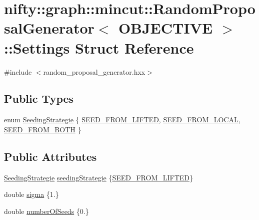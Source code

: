 \hypertarget{structnifty_1_1graph_1_1mincut_1_1RandomProposalGenerator_1_1Settings}{}\section{nifty\+:\+:graph\+:\+:mincut\+:\+:Random\+Proposal\+Generator$<$ O\+B\+J\+E\+C\+T\+I\+V\+E $>$\+:\+:Settings Struct Reference}
\label{structnifty_1_1graph_1_1mincut_1_1RandomProposalGenerator_1_1Settings}


{\ttfamily \#include $<$random\+\_\+proposal\+\_\+generator.\+hxx$>$}

\subsection*{Public Types}
\begin{DoxyCompactItemize}
\item 
enum \hyperlink{structnifty_1_1graph_1_1mincut_1_1RandomProposalGenerator_1_1Settings_a1037544cf92e5f126732c989c24e9dd1}{Seeding\+Strategie} \{ \hyperlink{structnifty_1_1graph_1_1mincut_1_1RandomProposalGenerator_1_1Settings_a1037544cf92e5f126732c989c24e9dd1a81b487c174807fb2dcb74976950dd0e6}{S\+E\+E\+D\+\_\+\+F\+R\+O\+M\+\_\+\+L\+I\+F\+T\+E\+D}, 
\hyperlink{structnifty_1_1graph_1_1mincut_1_1RandomProposalGenerator_1_1Settings_a1037544cf92e5f126732c989c24e9dd1a72e79898a1b8fc3fcfa97f6b76fa126f}{S\+E\+E\+D\+\_\+\+F\+R\+O\+M\+\_\+\+L\+O\+C\+A\+L}, 
\hyperlink{structnifty_1_1graph_1_1mincut_1_1RandomProposalGenerator_1_1Settings_a1037544cf92e5f126732c989c24e9dd1abe97589774d6da542ee8512d3ad73000}{S\+E\+E\+D\+\_\+\+F\+R\+O\+M\+\_\+\+B\+O\+T\+H}
 \}
\end{DoxyCompactItemize}
\subsection*{Public Attributes}
\begin{DoxyCompactItemize}
\item 
\hyperlink{structnifty_1_1graph_1_1mincut_1_1RandomProposalGenerator_1_1Settings_a1037544cf92e5f126732c989c24e9dd1}{Seeding\+Strategie} \hyperlink{structnifty_1_1graph_1_1mincut_1_1RandomProposalGenerator_1_1Settings_a1faf765d85ccfa38cd6d13cfa9072163}{seeding\+Strategie} \{\hyperlink{structnifty_1_1graph_1_1mincut_1_1RandomProposalGenerator_1_1Settings_a1037544cf92e5f126732c989c24e9dd1a81b487c174807fb2dcb74976950dd0e6}{S\+E\+E\+D\+\_\+\+F\+R\+O\+M\+\_\+\+L\+I\+F\+T\+E\+D}\}
\item 
double \hyperlink{structnifty_1_1graph_1_1mincut_1_1RandomProposalGenerator_1_1Settings_a457e00b5b4127dea774c5579b7a6ee96}{sigma} \{1.\}
\item 
double \hyperlink{structnifty_1_1graph_1_1mincut_1_1RandomProposalGenerator_1_1Settings_af03c32ab6535c0f970357c25bae30a61}{number\+Of\+Seeds} \{0.\}
\end{DoxyCompactItemize}


